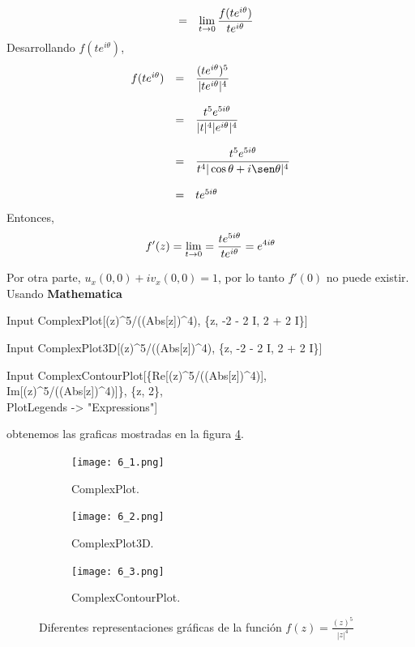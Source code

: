 \begin{Ejem}
\[\begin{array}{ccl}
			&=&\displaystyle\lim_{t\rightarrow0}\dfrac{f(te^{i\theta})}{te^{i\theta}}
		\end{array}
	\]
	Desarrollando $f(te^{i\theta})$, 
	\[
	\begin{array}{ccl}
		f(te^{i\theta})&=&\dfrac{(te^{i\theta})^5}{|te^{i\theta}|^4}\\\\
		&=&\dfrac{t^5e^{5i\theta}}{|t|^4|e^{i\theta}|^4}\\\\
		&=&\dfrac{t^5e^{5i\theta}}{t^4 |\cos\theta+i\sen \theta|^4}\\\\
		&=&te^{5i\theta}
	\end{array}
	\]
	Entonces, 
	$$f'(z)=\displaystyle\lim_{t\rightarrow0}=\dfrac{te^{5i\theta}}{te^{i\theta}}=e^{4i\theta}$$
	
	Por otra parte,  $u_x(0,0)+iv_x(0,0)=1$, por lo tanto $f'(0)$ no puede existir. \\
	Usando \textbf{Mathematica}
	\begin{mmaCell}{Input}
		ComplexPlot[(z)^5/((Abs[z])^4), \{z, -2 - 2 I, 2 + 2 I\}]
	\end{mmaCell}
	
	\begin{mmaCell}{Input}
		ComplexPlot3D[(z)^5/((Abs[z])^4), \{z, -2 - 2 I, 2 + 2 I\}]
	\end{mmaCell}
	
	\begin{mmaCell}{Input}
		ComplexContourPlot[\{Re[(z)^5/((Abs[z])^4)],\\Im[(z)^5/((Abs[z])^4)]\}, \{z, 2\},\\PlotLegends -> "Expressions"]
	\end{mmaCell}
	obtenemos las graficas mostradas en la figura \ref{fig:ej_6}.\\	
	\begin{figure}[htbp!]
		\centering
		\begin{subfigure}{0.2\textwidth}
			\texttt{[image: 6\_1.png]}
			\caption{ComplexPlot.}
			\label{fig:ej_6_1}
		\end{subfigure}
		\begin{subfigure}{0.3\textwidth}
			\texttt{[image: 6\_2.png]}
			\caption{ComplexPlot3D.}
			\label{fig:ej_6_2}
		\end{subfigure}
		\begin{subfigure}{0.3\textwidth}
			\texttt{[image: 6\_3.png]}
			\caption{ComplexContourPlot.}
			\label{fig:ej_6_3}
		\end{subfigure}
		\caption{Diferentes representaciones gráficas de la función $f(z)=\frac{(z)^5}{|z|^4}$}
		\label{fig:ej_6}
	\end{figure}
	

\end{Ejem}

